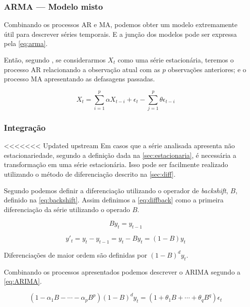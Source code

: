\documentclass[
    12pt,
    oneside,
    a4paper,
    english,
    brazil
]{abntex2}
\begin{document}
\subsubsection{ARMA --- Modelo misto}

Combinando os processos AR e MA, podemos obter um modelo extremamente útil para
descrever  séries temporais.  E a  junção dos  modelos pode  ser expressa  pela
\autoref{eq:arma}.

Então, segundo , se  considerarmos $X_t$ como uma
série estacionária, teremos  o processo AR relacionando a  observação atual com
as  $p$ observações  anteriores; e  o  processo MA  apresentando as  defasagens
passadas.

\begin{equation}
    \label{eq:arma}
    X_t = \sum_{i = 1}^{p}{\alpha X_{t-i}} + \epsilon_t - \sum_{j = 1}^{p}{\theta \epsilon_{t-i}}
\end{equation}

\subsubsection{Integração}

<<<<<<< Updated upstream
Em  casos  que a  série  analisada  apresenta  não estacionariedade, segundo  a
definição dada  na \autoref{sec:estacionaria}, é necessária  a transformação em
uma série estacionária. Isso pode  ser facilmente realizado utilizando o método
de  diferenciação  descrito na  \autoref{sec:diff}.

Segundo  podemos definir  a diferenciação utilizando o operador
de \textit{backshift}, $B$, definido na \autoref{eq:backshift}. Assim definimos
a \autoref{eq:diffback}  como a  primeira diferenciação  da série  utilizando o
operado $B$.

\begin{equation}
    \label{eq:backshift}
    By_t = y_{t-1}
\end{equation}

\begin{equation}
    \label{eq:diffback}
    y'_t = y_t - y_{t-1} = y_t - By_t = (1-B)y_t
\end{equation}

Diferenciações de maior ordem são definidas por $(1-B)^dy_t$.

Combinando  os  processos apresentados  podemos  descrever  o ARIMA  segundo  a
\autoref{eq:ARIMA}.

\begin{equation}
    \label{eq:ARIMA}
    (1 - \alpha_1B-\cdots-\alpha_pB^p)(1-B)^dy_t=(1+\theta_1B+\cdots+\theta_qB^q)\epsilon_t
\end{equation}
\end{document}
